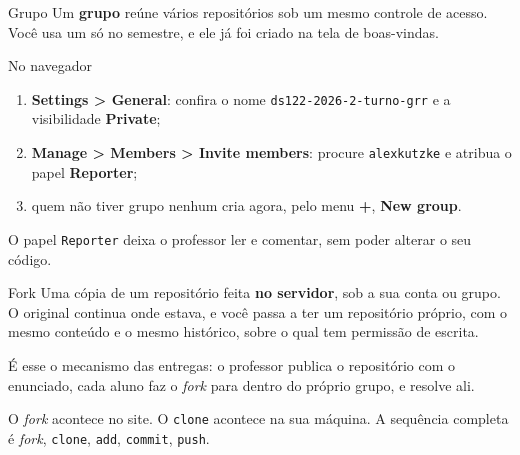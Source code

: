 \documentclass{beamer}
\newenvironment{nonavegador}
  {\begin{exampleblock}{No navegador}}
  {\end{exampleblock}}
\begin{document}
\begin{frame}{Grupo}
  Um \textbf{grupo} reúne vários repositórios sob um mesmo controle de acesso.
  Você usa um só no semestre, e ele já foi criado na tela de boas-vindas.

  \vspace{0.3cm}
  \begin{nonavegador}
    \begin{enumerate}
      \item \textbf{Settings > General}: confira o nome
            \texttt{ds122-2026-2-turno-grr} e a visibilidade \textbf{Private};
      \item \textbf{Manage > Members > Invite members}: procure
            \texttt{alexkutzke} e atribua o papel \textbf{Reporter};
      \item quem não tiver grupo nenhum cria agora, pelo menu \textbf{+},
            \textbf{New group}.
    \end{enumerate}
  \end{nonavegador}

  \vspace{0.2cm}
  \footnotesize O papel \texttt{Reporter} deixa o professor ler e comentar, sem
  poder alterar o seu código.
\end{frame}

\begin{frame}{Fork}
  Uma cópia de um repositório feita \textbf{no servidor}, sob a sua conta ou
  grupo. O original continua onde estava, e você passa a ter um repositório
  próprio, com o mesmo conteúdo e o mesmo histórico, sobre o qual tem permissão
  de escrita.

  \vspace{0.4cm}
  É esse o mecanismo das entregas: o professor publica o repositório com o
  enunciado, cada aluno faz o \textit{fork} para dentro do próprio grupo, e
  resolve ali.

  \vspace{0.4cm}
  \begin{block}{}
    O \textit{fork} acontece no site. O \texttt{clone} acontece na sua máquina.
    A sequência completa é \textit{fork}, \texttt{clone}, \texttt{add},
    \texttt{commit}, \texttt{push}.
  \end{block}
\end{frame}
\end{document}
